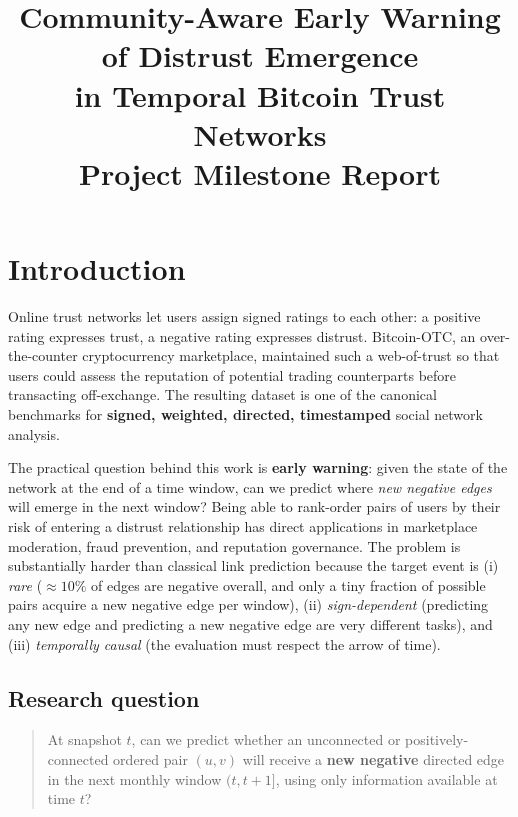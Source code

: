 \documentclass[11pt,a4paper]{article}
\title{\textbf{Community-Aware Early Warning of Distrust Emergence\\
in Temporal Bitcoin Trust Networks} \\[4pt]
\large Project Milestone Report}
\author{}
\date{}
\begin{document}
\maketitle

\section{Introduction}

Online trust networks let users assign signed ratings to each other: a
positive rating expresses trust, a negative rating expresses distrust.
Bitcoin-OTC, an over-the-counter cryptocurrency marketplace, maintained such
a web-of-trust so that users could assess the reputation of potential trading
counterparts before transacting off-exchange. The resulting dataset
\citep{kumar2016} is one of the canonical benchmarks for \textbf{signed,
weighted, directed, timestamped} social network analysis.

The practical question behind this work is \textbf{early warning}: given the
state of the network at the end of a time window, can we predict where
\textit{new negative edges} will emerge in the next window? Being able to
rank-order pairs of users by their risk of entering a distrust relationship
has direct applications in marketplace moderation, fraud prevention, and
reputation governance. The problem is substantially harder than classical
link prediction because the target event is (i) \emph{rare} ($\approx 10\%$
of edges are negative overall, and only a tiny fraction of possible pairs
acquire a new negative edge per window), (ii) \emph{sign-dependent}
(predicting any new edge and predicting a new negative edge are very
different tasks), and (iii) \emph{temporally causal} (the evaluation must
respect the arrow of time).

\subsection{Research question}
\begin{quote}
At snapshot $t$, can we predict whether an unconnected or
positively-connected ordered pair $(u, v)$ will receive a \textbf{new
negative} directed edge in the next monthly window $(t, t{+}1]$, using only
information available at time $t$?
\end{quote}
\end{document}
